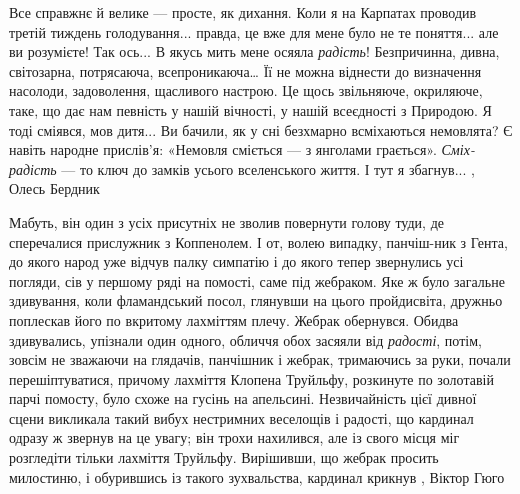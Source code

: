 Все справжнє й велике — просте, як дихання. Коли я на Карпатах проводив третій
тиждень голодування... правда, це вже для мене було не те поняття... але ви
розумієте! Так ось... В якусь мить мене осяяла \emph{радість}! Безпричинна,
дивна, світозарна, потрясаюча, всепроникаюча… Її не можна віднести до
визначення насолоди, задоволення, щасливого настрою. Це щось звільняюче,
окриляюче, таке, що дає нам певність у нашій вічності, у нашій всеєдності з
Природою. Я тоді сміявся, мов дитя... Ви бачили, як у сні безхмарно всміхаються
немовлята? Є навіть народне прислів’я: «Немовля сміється — з янголами
грається».  \emph{Сміх-радість} — то ключ до замків усього вселенського життя.
І тут я збагнув...
, Олесь Бердник

Мабуть, він один з усіх присутніх не зволив повернути голову туди, де
сперечалися прислужник з Коппенолем. І от, волею випадку, панчіш-ник з Гента,
до якого народ уже відчув палку симпатію і до якого тепер звернулись усі
погляди, сів у першому ряді на помості, саме під жебраком. Яке ж було загальне
здивування, коли фламандський посол, глянувши на цього пройдисвіта, дружньо
поплескав його по вкритому лахміттям плечу. Жебрак обернувся. Обидва
здивувались, упізнали один одного, обличчя обох засяяли від \emph{радості}, потім,
зовсім не зважаючи на глядачів, панчішник і жебрак, тримаючись за руки, почали
перешіптуватися, причому лахміття Клопена Труйльфу, розкинуте по золотавій
парчі помосту, було схоже на гусінь на апельсині.
Незвичайність цієї дивної сцени викликала такий вибух нестримних веселощів і
радості, що кардинал одразу ж звернув на це увагу; він трохи нахилився, але із
свого місця міг розгледіти тільки лахміття Труйльфу. Вирішивши, що жебрак
просить милостиню, і обурившись із такого зухвальства, кардинал крикнув
, Віктор Гюго

